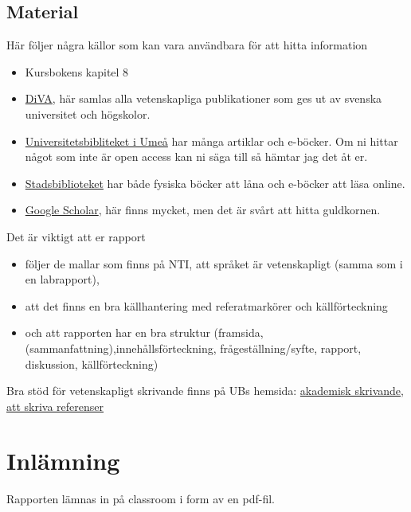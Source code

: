 \documentclass[11pt]{article}
\begin{document}
    \subsection{Material}
    Här följer några källor som kan vara användbara för att hitta information
    \begin{itemize}
        \item Kursbokens kapitel 8
        \item \href{https://www.diva-portal.org}{DiVA}, här samlas alla vetenskapliga publikationer som ges ut av svenska universitet och högskolor.
        \item \href{https://www.umu.se/bibliotek/}{Universitetsbibliteket i Umeå} har många artiklar och e-böcker. Om ni hittar något som inte är open access kan ni säga till så hämtar jag det åt er.
        \item \href{https://www.minabibliotek.se}{Stadsbiblioteket} har både fysiska böcker att låna och e-böcker att läsa online.
        \item \href{https://scholar.google.com/}{Google Scholar}, här finns mycket, men det är svårt att hitta guldkornen.
    \end{itemize}

    Det är viktigt att er rapport
    \begin{itemize}
    \item följer de mallar som finns på NTI, att språket är vetenskapligt (samma som i en labrapport),
    \item att det finns en bra källhantering med referatmarkörer och källförteckning
    \item och att rapporten har en bra struktur (framsida,(sammanfattning),innehållsförteckning,
    frågeställning/syfte, rapport, diskussion, källförteckning)
    \end{itemize}

    Bra stöd för vetenskapligt skrivande finns på UBs hemsida: \href{https://www.umu.se/bibliotek/soka-skriva-studera/akademiskt-skrivande/}{akademisk skrivande},
    \href{https://www.umu.se/bibliotek/soka-skriva-studera/skriva-referenser/}{att skriva referenser}
    \section{Inlämning}
    Rapporten lämnas in på classroom i form av en pdf-fil.
    \pagebreak
\end{document}
